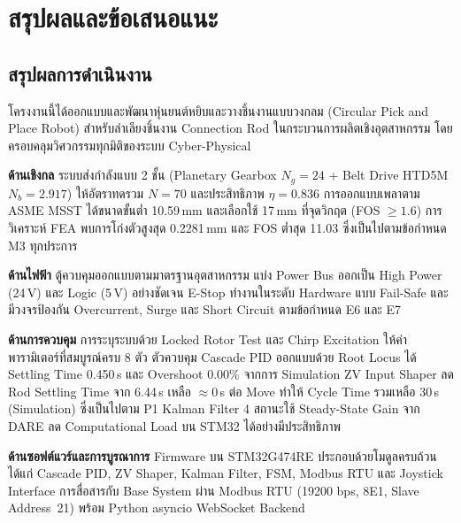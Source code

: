 
\chapter{สรุปผลและข้อเสนอแนะ}
\label{ch:conclusion}

\section{สรุปผลการดำเนินงาน}
\label{sec:conclusion}

โครงงานนี้ได้ออกแบบและพัฒนาหุ่นยนต์หยิบและวางชิ้นงานแบบวงกลม (Circular Pick and Place Robot)
สำหรับลำเลียงชิ้นงาน Connection Rod ในกระบวนการผลิตเชิงอุตสาหกรรม
โดยครอบคลุมวิศวกรรมทุกมิติของระบบ Cyber-Physical

\textbf{ด้านเชิงกล}
ระบบส่งกำลังแบบ 2 ชั้น (Planetary Gearbox $N_g = 24$ + Belt Drive HTD5M $N_b = 2.917$)
ให้อัตราทดรวม $N = 70$ และประสิทธิภาพ $\eta = 0.836$
การออกแบบเพลาตาม ASME MSST ได้ขนาดขั้นต่ำ 10.59\,mm
และเลือกใช้ 17\,mm ที่จุดวิกฤต (FOS $\geq 1.6$)
การวิเคราะห์ FEA พบการโก่งตัวสูงสุด 0.2281\,mm และ FOS ต่ำสุด 11.03
ซึ่งเป็นไปตามข้อกำหนด M3 ทุกประการ

\textbf{ด้านไฟฟ้า}
ตู้ควบคุมออกแบบตามมาตรฐานอุตสาหกรรม
แบ่ง Power Bus ออกเป็น High Power (24\,V) และ Logic (5\,V) อย่างชัดเจน
E-Stop ทำงานในระดับ Hardware แบบ Fail-Safe
และมีวงจรป้องกัน Overcurrent, Surge และ Short Circuit ตามข้อกำหนด E6 และ E7

\textbf{ด้านการควบคุม}
การระบุระบบด้วย Locked Rotor Test และ Chirp Excitation
ให้ค่าพารามิเตอร์ที่สมบูรณ์ครบ 8 ตัว
ตัวควบคุม Cascade PID ออกแบบด้วย Root Locus
ได้ Settling Time 0.450\,s และ Overshoot 0.00\% จากการ Simulation
ZV Input Shaper ลด Rod Settling Time จาก 6.44\,s เหลือ $\approx 0$\,s ต่อ Move
ทำให้ Cycle Time รวมเหลือ 30\,s (Simulation) ซึ่งเป็นไปตาม P1
Kalman Filter 4 สถานะใช้ Steady-State Gain จาก DARE
ลด Computational Load บน STM32 ได้อย่างมีประสิทธิภาพ

\textbf{ด้านซอฟต์แวร์และการบูรณาการ}
Firmware บน STM32G474RE ประกอบด้วยโมดูลครบถ้วน
ได้แก่ Cascade PID, ZV Shaper, Kalman Filter, FSM, Modbus RTU
และ Joystick Interface
การสื่อสารกับ Base System ผ่าน Modbus RTU (19200 bps, 8E1, Slave Address~21)
พร้อม Python asyncio WebSocket Backend

